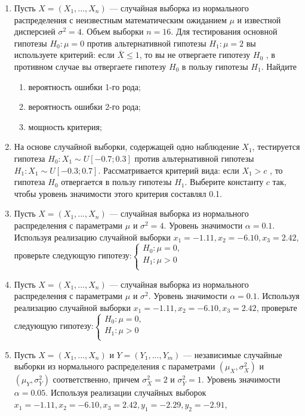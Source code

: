 \documentclass[12pt]{article}
\begin{document}
\begin{enumerate}
\item Пусть $X = (X_{1},..., X_{n})$ — случайная выборка из нормального распределения с неизвестным математическим ожиданием $\mu$ и известной дисперсией $\sigma^2 = 4$. Объем выборки $n = 16$. Для тестирования основной гипотезы $H_{0}:\mu = 0$ против
альтернативной гипотезы $H_{1}:\mu = 2$ вы используете критерий: если $\bar{X} \leq 1$, то вы не отвергаете гипотезу $H_{0}$ , в противном случае вы отвергаете гипотезу $H_{0}$ в пользу гипотезы $H_{1}$. Найдите

\begin{enumerate}
   \item  вероятность ошибки 1-го рода;
   \item вероятность ошибки 2-го рода;
   \item мощность критерия;
\end{enumerate}


\item На основе случайной выборки, содержащей одно наблюдение $X_{1}$, тестируется гипотеза $H_{0} : X_{1} \sim U[-0.7;0.3]$ против альтернативной гипотезы $H_{1}: X_{1} \sim U[-0.3;0.7]$. Рассматривается критерий вида: если $X_{1} > c$ , то гипотеза $H_{0}$ отвергается в пользу гипотезы $H_{1}$. Выберите константу $c$ так, чтобы уровень значимости этого критерия составлял 0.1.

\item Пусть $X = (X_{1},..., X_{n})$ — случайная выборка из нормального распределения с параметрами $\mu$ и $\sigma^2 = 4$. Уровень значимости  $\alpha = 0.1$. Используя
реализацию случайной выборки $x_{1} = -1.11, x_{2} = -6.10, x_{3} = 2.42$, проверьте следующую гипотезу:$\begin{cases}
H_{0}:\mu = 0, \\
H_{1}:\mu > 0 \\
\end{cases}$

\item Пусть $X = (X_{1},..., X_{n})$ — случайная выборка из нормального распределения с параметрами $\mu$ и $\sigma^2$. Уровень значимости  $\alpha = 0.1$. Используя
реализацию случайной выборки $x_{1} = -1.11, x_{2} = -6.10, x_{3} = 2.42$, проверьте следующую гипотезу:$\begin{cases}
H_{0}:\mu = 0, \\
H_{1}:\mu > 0 \\
\end{cases}$

\item Пусть $X = (X_{1},..., X_{n})$ и $Y = (Y_{1},..., Y_{m})$ — независимые случайные
выборки из нормального распределения с параметрами $(\mu_{X},\sigma^2_{X})$ и $(\mu_{Y},\sigma^2_{Y})$ соответственно, причем  $\sigma^2_{X} = 2$ и $\sigma^2_{Y} = 1$. Уровень значимости $\alpha = 0.05$. Используя реализации случайных выборок\newline
\hspace*{3cm}$x_{1} = -1.11, x_{2} = -6.10, x_{3} = 2.42, y_{1} = -2.29, y_{2} = -2.91$,


\end{enumerate}
\end{document}
